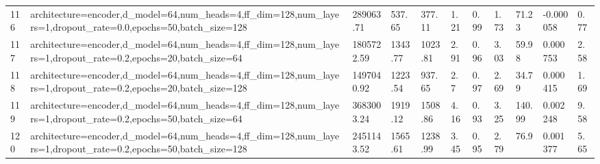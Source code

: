 \begin{longtable}{C{0.8cm} L{2cm} C{1.15cm} C{1.15cm} C{1.15cm} C{1.15cm} C{0.85cm} C{1.25cm} C{1.2cm} C{1.5cm} C{1.0cm}}
116 & architecture=encoder,\newline d\_model=64,\newline num\_heads=4,\newline ff\_dim=128,\newline num\_layers=1,\newline dropout\_rate=0.0,\newline epochs=50,\newline batch\_size=128 & 289063.71 & 537.65 & 377.11 & 1.21 & 0.99 & 1.73 & 71.23 & -0.000058 & 0.77 \\
117 & architecture=encoder,\newline d\_model=64,\newline num\_heads=4,\newline ff\_dim=128,\newline num\_layers=1,\newline dropout\_rate=0.2,\newline epochs=20,\newline batch\_size=64 & 1805722.59 & 1343.77 & 1023.81 & 2.91 & 0.96 & 3.03 & 59.98 & 0.000753 & 2.58 \\
118 & architecture=encoder,\newline d\_model=64,\newline num\_heads=4,\newline ff\_dim=128,\newline num\_layers=1,\newline dropout\_rate=0.2,\newline epochs=20,\newline batch\_size=128 & 1497040.92 & 1223.54 & 937.65 & 2.7 & 0.97 & 2.69 & 34.79 & 0.000415 & 1.69 \\
119 & architecture=encoder,\newline d\_model=64,\newline num\_heads=4,\newline ff\_dim=128,\newline num\_layers=1,\newline dropout\_rate=0.2,\newline epochs=50,\newline batch\_size=64 & 3683003.24 & 1919.12 & 1508.86 & 4.16 & 0.93 & 3.25 & 140.99 & 0.002248 & 9.58 \\
120 & architecture=encoder,\newline d\_model=64,\newline num\_heads=4,\newline ff\_dim=128,\newline num\_layers=1,\newline dropout\_rate=0.2,\newline epochs=50,\newline batch\_size=128 & 2451143.52 & 1565.61 & 1238.99 & 3.45 & 0.95 & 2.79 & 76.9 & 0.001377 & 5.65 \\

\end{longtable}
